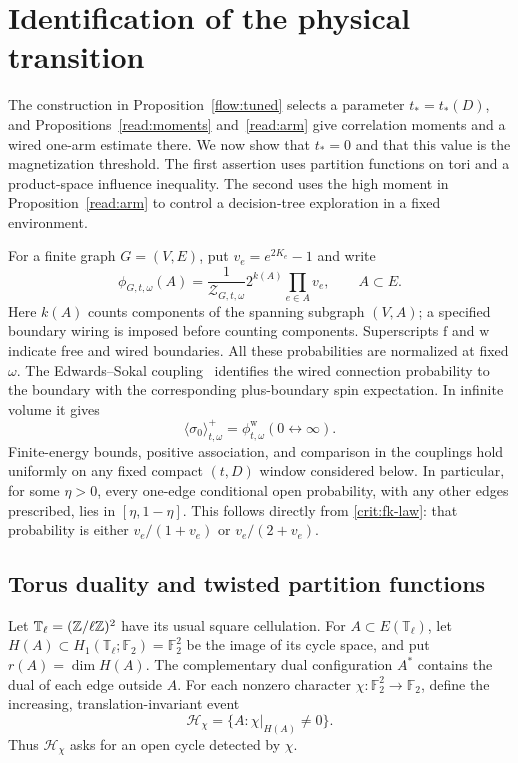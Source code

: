 \section{Identification of the physical transition}
\label{sec:transition}

The construction in Proposition~\ref{flow:tuned} selects a parameter
$t_*=t_*(D)$, and Propositions~\ref{read:moments} and~\ref{read:arm}
give correlation moments and a wired one-arm estimate there.  We now show
that $t_*=0$ and that this value is the magnetization threshold.  The
first assertion uses partition functions on tori and a product-space
influence inequality.  The second uses the high moment in
Proposition~\ref{read:arm} to control a decision-tree exploration in a fixed
environment.

For a finite graph $G=(V,E)$, put $v_e=e^{2K_e}-1$ and write
\begin{equation}\label{crit:fk-law}
 \phi_{G,t,\omega}(A)
 =\frac{1}{\mathcal Z_{G,t,\omega}}
       2^{k(A)}\prod_{e\in A}v_e,
 \qquad A\subset E.
\end{equation}
Here $k(A)$ counts components of the spanning subgraph $(V,A)$; a
specified boundary wiring is imposed before counting components.
Superscripts $\mathrm f$ and $\mathrm w$ indicate free and wired
boundaries.  All these probabilities are normalized at fixed $\omega$.
The Edwards--Sokal coupling~\cite{EdwardsSokal1988} identifies the
wired connection probability to the boundary with the corresponding
plus-boundary spin expectation.  In infinite volume it gives
\begin{equation}\label{crit:magnetization}
 \langle\sigma_0\rangle^+_{t,\omega}
       =\phi^{\mathrm w}_{t,\omega}(0\longleftrightarrow\infty).
\end{equation}
Finite-energy bounds, positive association, and comparison in the
couplings hold uniformly on any fixed compact $(t,D)$ window considered
below.  In particular, for some $\eta>0$, every one-edge conditional
open probability, with any other edges prescribed, lies in
$[\eta,1-\eta]$.  This follows directly from
\eqref{crit:fk-law}: that probability is either $v_e/(1+v_e)$ or
$v_e/(2+v_e)$.

\subsection{Torus duality and twisted partition functions}

Let $\mathbb T_\ell=(\mathbb Z/\ell\mathbb Z)^2$ have its usual square cellulation.
For $A\subset E(\mathbb T_\ell)$, let
$H(A)\subset H_1(\mathbb T_\ell;\mathbb F_2)=\mathbb F_2^2$ be the
image of its cycle space, and put $r(A)=\dim H(A)$.  The complementary
dual configuration $A^*$ contains the dual of each edge outside $A$.
For each nonzero character
$\chi:\mathbb F_2^2\longrightarrow\mathbb F_2$, define the increasing,
translation-invariant event
\[
 \mathcal H_\chi=\{A:\chi|_{H(A)}\ne0\}.
\]
Thus $\mathcal H_\chi$ asks for an open cycle detected by $\chi$.

